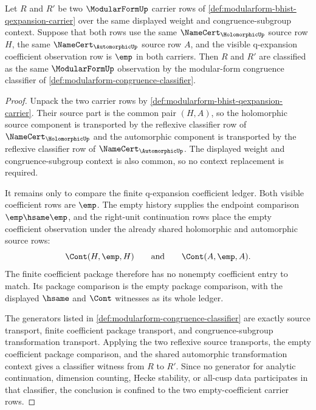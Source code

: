 \begin{theorem}
\label{thm:modularform-empty-coefficient-classifier}
Let $R$ and $R'$ be two $\ModularFormUp$ carrier rows of \autoref{def:modularform-bhist-qexpansion-carrier} over the same displayed weight and congruence-subgroup context. Suppose that both rows use the same $\NameCert_{\HolomorphicUp}$ source row $H$, the same $\NameCert_{\AutomorphicUp}$ source row $A$, and the visible q-expansion coefficient observation row is $\emp$ in both carriers. Then $R$ and $R'$ are classified as the same $\ModularFormUp$ observation by the modular-form congruence classifier of \autoref{def:modularform-congruence-classifier}.
\end{theorem}
\begin{proof}
Unpack the two carrier rows by \autoref{def:modularform-bhist-qexpansion-carrier}. Their source part is the common pair $(H,A)$, so the holomorphic source component is transported by the reflexive classifier row of $\NameCert_{\HolomorphicUp}$ and the automorphic component is transported by the reflexive classifier row of $\NameCert_{\AutomorphicUp}$. The displayed weight and congruence-subgroup context is also common, so no context replacement is required.

It remains only to compare the finite q-expansion coefficient ledger. Both visible coefficient rows are $\emp$. The empty history supplies the endpoint comparison $\emp\hsame\emp$, and the right-unit continuation rows place the empty coefficient observation under the already shared holomorphic and automorphic source rows:
$$
\Cont(H,\emp,H)
\qquad\text{and}\qquad
\Cont(A,\emp,A).
$$
The finite coefficient package therefore has no nonempty coefficient entry to match. Its package comparison is the empty package comparison, with the displayed $\hsame$ and $\Cont$ witnesses as its whole ledger.

The generators listed in \autoref{def:modularform-congruence-classifier} are exactly source transport, finite coefficient package transport, and congruence-subgroup transformation transport. Applying the two reflexive source transports, the empty coefficient package comparison, and the shared automorphic transformation context gives a classifier witness from $R$ to $R'$. Since no generator for analytic continuation, dimension counting, Hecke stability, or all-cusp data participates in that classifier, the conclusion is confined to the two empty-coefficient carrier rows.
\end{proof}
